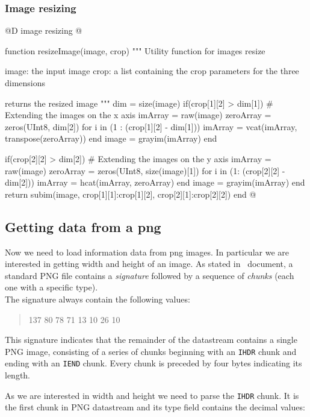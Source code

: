 \documentclass[11pt,oneside]{article}	%
\begin{document}
\subsubsection{Image resizing}\label{sec:imageResize}

@D image resizing
@{function resizeImage(image, crop)
  """
  Utility function for images resize
  
  image: the input image
  crop: a list containing the crop parameters 
        for the three dimensions 
  
  returns the resized image
  """
  dim = size(image)
  if(crop[1][2] > dim[1])
    # Extending the images on the x axis
    imArray = raw(image)
    zeroArray = zeros(UInt8, dim[2])
    for i in (1 : (crop[1][2] - dim[1]))
      imArray = vcat(imArray, transpose(zeroArray))
    end
    image = grayim(imArray)
  end
  
  if(crop[2][2] > dim[2])
    # Extending the images on the y axis
    imArray = raw(image)
    zeroArray = zeros(UInt8, size(image)[1])
    for i in (1: (crop[2][2] - dim[2]))
      imArray = hcat(imArray, zeroArray)
    end
    image = grayim(imArray)
  end
  return subim(image, crop[1][1]:crop[1][2], crop[2][1]:crop[2][2])
end @}

\subsection{Getting data from a png}\label{sec:getData}

Now we need to load information data from png images. In particular we are interested in getting width and height of an image. As stated in~\cite{W3CPNG} document, a standard PNG file contains a \textit{signature} followed by a sequence of \textit{chunks} (each one with a specific type).\\

The signature always contain the following values:

\begin{quote}
 137 80 78 71 13 10 26 10
\end{quote}
   
This signature indicates that the remainder of the datastream contains a single PNG image, consisting of a series of chunks beginning with an \texttt{IHDR} chunk and ending with an \texttt{IEND} chunk. Every chunk is preceded by four bytes indicating its length.

As we are interested in width and height we need to parse the \texttt{IHDR} chunk. It is the first chunk in PNG datastream and its type field contains the decimal values:
\end{document}
